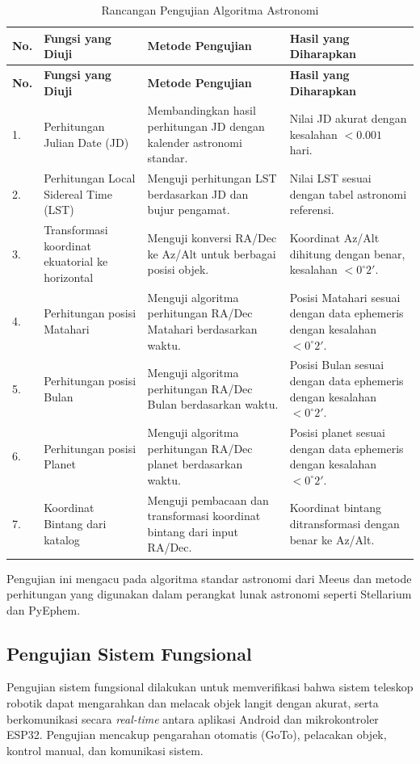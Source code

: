 \begin{longtable}{|b{}|p{}|p{}|p{}|}
	\caption{Rancangan Pengujian Algoritma Astronomi}
	\label{table:3.ujiAstronomy}\\
	\hline
	\textbf{No.} & \textbf{Fungsi yang Diuji} & \textbf{Metode Pengujian} & \textbf{Hasil yang Diharapkan} \\
	\hline
	\endfirsthead
	\hline
	\textbf{No.} & \textbf{Fungsi yang Diuji} & \textbf{Metode Pengujian} & \textbf{Hasil yang Diharapkan} \\
	\hline
	\endhead
	
	1. & Perhitungan Julian Date (JD) & Membandingkan hasil perhitungan JD dengan kalender astronomi standar. & Nilai JD akurat dengan kesalahan $< 0.001$ hari. \\
	\hline
	2. & Perhitungan Local Sidereal Time (LST) & Menguji perhitungan LST berdasarkan JD dan bujur pengamat. & Nilai LST sesuai dengan tabel astronomi referensi. \\
	\hline
	3. & Transformasi koordinat ekuatorial ke horizontal & Menguji konversi RA/Dec ke Az/Alt untuk berbagai posisi objek. & Koordinat Az/Alt dihitung dengan benar, kesalahan $< 0^\circ2'$. \\
	\hline
	4. & Perhitungan posisi Matahari & Menguji algoritma perhitungan RA/Dec Matahari berdasarkan waktu. & Posisi Matahari sesuai dengan data ephemeris dengan kesalahan $< 0^\circ2'$. \\
	\hline
	5. & Perhitungan posisi Bulan & Menguji algoritma perhitungan RA/Dec Bulan berdasarkan waktu. & Posisi Bulan sesuai dengan data ephemeris dengan kesalahan $< 0^\circ2'$. \\
	\hline
	6. & Perhitungan posisi Planet & Menguji algoritma perhitungan RA/Dec planet berdasarkan waktu. & Posisi planet sesuai dengan data ephemeris dengan kesalahan $< 0^\circ2'$. \\
	\hline
	7. & Koordinat Bintang dari katalog & Menguji pembacaan dan transformasi koordinat bintang dari input RA/Dec. & Koordinat bintang ditransformasi dengan benar ke Az/Alt. \\
	\hline
\end{longtable}

Pengujian ini mengacu pada algoritma standar astronomi dari Meeus \cite{Meeus1998} dan metode perhitungan yang digunakan dalam perangkat lunak astronomi seperti Stellarium dan PyEphem.

\subsection{Pengujian Sistem Fungsional}
Pengujian sistem fungsional dilakukan untuk memverifikasi bahwa sistem teleskop robotik dapat mengarahkan dan melacak objek langit dengan akurat, serta berkomunikasi secara \textit{real-time} antara aplikasi Android dan mikrokontroler ESP32. Pengujian mencakup pengarahan otomatis (GoTo), pelacakan objek, kontrol manual, dan komunikasi sistem. \par

